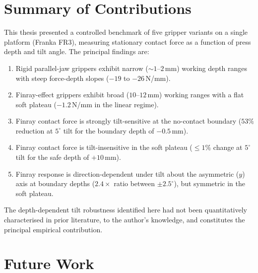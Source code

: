 \label{ch:conclusion}

\section{Summary of Contributions}

This thesis presented a controlled benchmark of five gripper variants on a
single platform (Franka FR3), measuring stationary contact force as a
function of press depth and tilt angle. The principal findings are:
\begin{enumerate}
  \item Rigid parallel-jaw grippers exhibit narrow ($\sim 1$--$2$\,mm)
        working depth ranges with steep force-depth slopes ($-19$ to
        $-26$\,N/mm).
  \item Finray-effect grippers exhibit broad ($10$--$12$\,mm) working
        ranges with a flat soft plateau ($-1.2$\,N/mm in the linear
        regime).
  \item Finray contact force is strongly tilt-sensitive at the no-contact
        boundary ($53\%$ reduction at $5^{\circ}$ tilt for the boundary
        depth of $-0.5$\,mm).
  \item Finray contact force is tilt-insensitive in the soft plateau
        ($\leq 1\%$ change at $5^{\circ}$ tilt for the safe depth of
        $+10$\,mm).
  \item Finray response is direction-dependent under tilt about the
        asymmetric ($y$) axis at boundary depths ($2.4\times$ ratio
        between $\pm 2.5^{\circ}$), but symmetric in the soft plateau.
\end{enumerate}

The depth-dependent tilt robustness identified here had not been
quantitatively characterised in prior literature, to the author's knowledge,
and constitutes the principal empirical contribution.

\section{Future Work}

